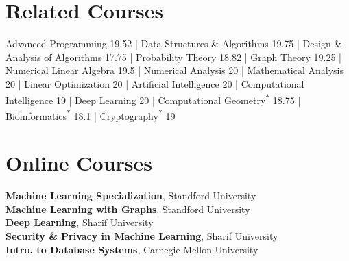 	
\section{Related Courses}
Advanced Programming 19.52 | 
Data Structures \& Algorithms 19.75 | 
Design \& Analysis of Algorithms 17.75 | Probability Theory 18.82 |
Graph Theory 19.25 |
Numerical Linear Algebra 19.5 | 
Numerical Analysis 20 | 
Mathematical Analysis 20 |
Linear Optimization 20 |
Artificial Intelligence 20 | 
Computational Intelligence 19 |
Deep Learning 20 | 
Computational Geometry\textsuperscript{*} 18.75 |
Bioinformatics\textsuperscript{*}  18.1 | Cryptography\textsuperscript{*} 19 
\section{Online Courses}
\textbf{Machine Learning Specialization}, Standford University \\
\textbf{Machine Learning with Graphs}, Standford University \\
\textbf{Deep Learning}, Sharif University \\
\textbf{Security \& Privacy in Machine Learning}, Sharif University \\
\textbf{Intro. to Database Systems}, Carnegie Mellon University 
